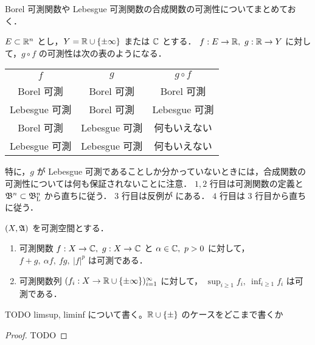 \begin{remark}
    Borel 可測関数や Lebesgue 可測関数の合成関数の可測性についてまとめておく．

    $E\subset\mathbb{R}^n$ とし，$Y=\mathbb{R}\cup\{\pm\infty\}$ または $\mathbb{C}$ とする．
    $f:E\to\mathbb{R},\ g:\mathbb{R}\to Y$ に対して，$g\circ f$ の可測性は次の表のようになる．

    \begin{table}[h]
        \centering
        \begin{tabular}{|c|c||c|}
            \hline
            $f$ & $g$ & $g\circ f$\\
            \hhline{|=|=#=|}
            Borel 可測 & Borel 可測 & Borel 可測\\
            \hline
            Lebesgue 可測 & Borel 可測 & Lebesgue 可測\\
            \hline
            Borel 可測 & Lebesgue 可測 & 何もいえない\\
            \hline
            Lebesgue 可測 & Lebesgue 可測 & 何もいえない\\
            \hline
        \end{tabular}
    \end{table}

    特に，$g$ が Lebesgue 可測であることしか分かっていないときには，合成関数の可測性については何も保証されないことに注意．
    $1,2$ 行目は可測関数の定義と $\mathfrak{B}^n\subset\mathfrak{B}_{\mathrm{L}}^n$ から直ちに従う．
    $3$ 行目は反例が \cite[\S2 Exercise 9]{Fo99}\cite[pp.72--73]{It63} にある．
    $4$ 行目は $3$ 行目から直ちに従う．
\end{remark}

\begin{theorem}\label{thm:elementary_measuable_functions}
    $(X,\mathfrak{A})$ を可測空間とする．
    \begin{enumerate}
        \item 可測関数 $f:X\to\Cbb,\ g:X\to\Cbb$ と $\alpha\in\Cbb,\ p>0$ に対して，$f+g,\ \alpha f,\ fg,\ |f|^p$ は可測である．
        \item 可測関数列 $(f_i:X\to\mathbb{R}\cup\{\pm\infty\})_{i=1}^\infty$ に対して，
            $\displaystyle\sup_{i\ge1}f_i,\ \inf_{i\ge1}f_i$ は可測である．
    \end{enumerate}
    {\color{red} TODO limsup, liminf について書く。$\mathbb{R}\cup\{\pm\}$ のケースをどこまで書くか}
\end{theorem}

\begin{proof}
    {\color{red} TODO}
\end{proof}

